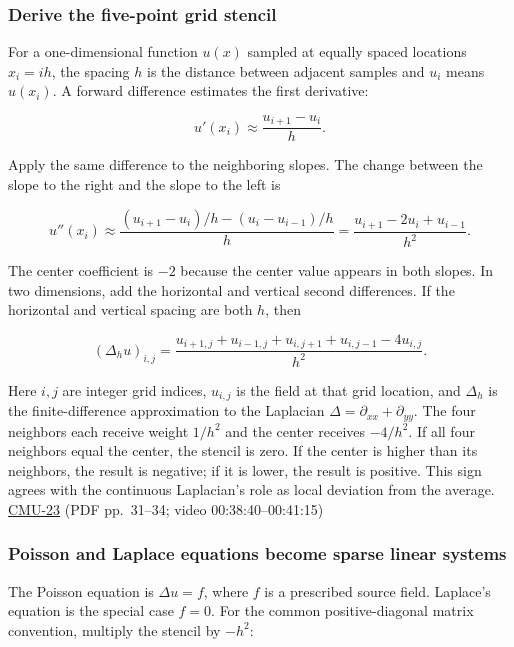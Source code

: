 \subsubsection{Derive the five-point grid stencil}\label{04-visual-computing-ii-ch030-derive-the-five-point-grid-stencil}

For a one-dimensional function \(u(x)\) sampled at equally spaced locations \(x_i=ih\), the spacing \(h\) is the distance between adjacent samples and \(u_i\) means \(u(x_i)\). A forward difference estimates the first derivative:

\[
u'(x_i)\approx\frac{u_{i+1}-u_i}{h}.
\]

Apply the same difference to the neighboring slopes. The change between the slope to the right and the slope to the left is

\[
u''(x_i)\approx\frac{(u_{i+1}-u_i)/h-(u_i-u_{i-1})/h}{h}
=\frac{u_{i+1}-2u_i+u_{i-1}}{h^2}.
\]

The center coefficient is \(-2\) because the center value appears in both slopes. In two dimensions, add the horizontal and vertical second differences. If the horizontal and vertical spacing are both \(h\), then

\[
(\Delta_h u)_{i,j}=\frac{u_{i+1,j}+u_{i-1,j}+u_{i,j+1}+u_{i,j-1}-4u_{i,j}}{h^2}.
\]

Here \(i,j\) are integer grid indices, \(u_{i,j}\) is the field at that grid location, and \(\Delta_h\) is the finite-difference approximation to the Laplacian \(\Delta=\partial_{xx}+\partial_{yy}\). The four neighbors each receive weight \(1/h^2\) and the center receives \(-4/h^2\). If all four neighbors equal the center, the stencil is zero. If the center is higher than its neighbors, the result is negative; if it is lower, the result is positive. This sign agrees with the continuous Laplacian's role as local deviation from the average. \hyperref[04-visual-computing-ii-ch036-cmu-23---physically-based-animation-and-pdes]{CMU-23} (PDF pp.~31--34; video 00:38:40--00:41:15)

\subsubsection{Poisson and Laplace equations become sparse linear systems}\label{04-visual-computing-ii-ch030-poisson-and-laplace-equations-become-sparse-linear-systems}

The Poisson equation is \(\Delta u=f\), where \(f\) is a prescribed source field. Laplace's equation is the special case \(f=0\). For the common positive-diagonal matrix convention, multiply the stencil by \(-h^2\):

